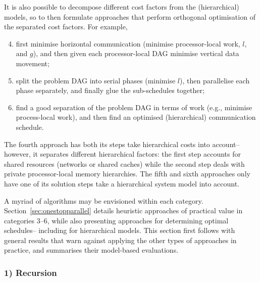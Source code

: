 \documentclass[oneside,reqno, a4paper]{amsart}
\numberwithin{equation}{section}
\begin{document}
It is also possible to decompose different cost factors from the (hierarchical) models,
so to then formulate approaches that perform orthogonal optimisation of the separated cost factors.
For example,
\begin{enumerate}
	\setcounter{enumi}{3}
	\item first minimise horizontal communication (minimise processor-local work, $l$, and $g$),
	and then given each processor-local DAG minimise vertical data movement;
	\item split the problem DAG into serial phases (minimise $l$),
	then parallelise each phase separately,
	and finally glue the sub-schedules together;
	\item find a good separation of the problem DAG in terms of work (e.g., minimise process-local work),
	and then find an optimised (hierarchical) communication schedule.
\end{enumerate}	
The fourth approach has both its steps take hierarchical costs into account--
however, it separates different hierarchical factors:
the first step accounts for shared resources (networks or shared caches) while the second step deals with private processor-local memory hierarchies. %
The fifth and sixth approaches only have one of its solution steps take a hierarchical system model into account.

A myriad of algorithms may be envisioned within each category.
Section~\ref{sec:onestopparallel} details heuristic approaches of practical value in categories $3$--$6$,
while also presenting approaches for determining optimal schedules--
including for hierarchical models. 
This section first follows with general results that warn against applying the other types of approaches in practice,
and summarises their model-based evaluations.

\subsubsection*{1) Recursion}
\end{document}
